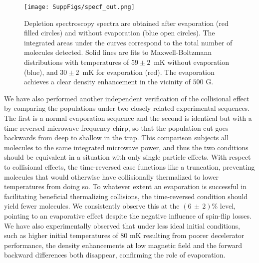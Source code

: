 \documentclass[%
 reprint,
 amsmath,amssymb,
 aps,
prl,
]{revtex4-1}
\begin{document}
\begin{figure}[tb]
\texttt{[image: SuppFigs/specf\_out.png]}%
\caption{
Depletion spectroscopy spectra are obtained after evaporation (red filled circles) and without evaporation (blue open circles). The integrated areas under the curves correspond to the total number of molecules detected. Solid lines are fits to Maxwell-Boltzmann distributions with temperatures of $59\pm2$~mK without evaporation (blue), and $30\pm2$~mK for evaporation (red). The evaporation achieves a clear density enhancement in the vicinity of $500\text{ G}$.
}
\label{fig:normenhance}
\end{figure}

We have also performed another independent verification of the collisional effect by comparing the populations under two closely related experimental sequences.
The first is a normal evaporation sequence and the second is identical but with a time-reversed microwave frequency chirp, so that the population cut goes backwards from deep to shallow in the trap.
This comparison subjects all molecules to the same integrated microwave power, and thus the two conditions should be equivalent in a situation with only single particle effects.
With respect to collisional effects, the time-reversed case functions like a truncation, preventing molecules that would otherwise have collisionally thermalized to lower temperatures from doing so.
To whatever extent an evaporation is successful in facilitating beneficial thermalizing collisions, the time-reversed condition should yield fewer molecules.
We consistently observe this at the $(6\,{\pm}\,2)\%$ level, pointing to an evaporative effect despite the negative influence of spin-flip losses.
We have also experimentally observed that under less ideal initial conditions, such as higher initial temperatures of $80\text{ mK}$ resulting from poorer decelerator performance, the density enhancements at low magnetic field and the forward backward differences both disappear, confirming the role of evaporation. 
\end{document}
